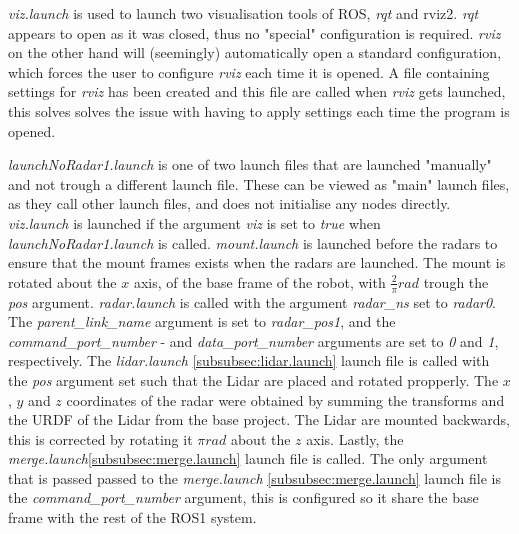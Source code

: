 \textit{viz.launch} is used to launch two visualisation tools of ROS, \textit{rqt} and {rviz2}. \textit{rqt} appears to open as it was closed, thus no "special" configuration is required. \textit{rviz} on the other hand will (seemingly) automatically open a standard configuration, which forces the user to configure \textit{rviz} each time it is opened. A file containing settings for \textit{rviz} has been created and this file are called when \textit{rviz} gets launched, this solves solves the issue with having to apply settings each time the program is opened.

\label{subsubsec:launchNoRadar1.launch}
\textit{launchNoRadar1.launch} is one of two launch files that are launched "manually" and not trough a different launch file. These can be viewed as "main" launch files, as they call other launch files, and does not initialise any nodes directly. \textit{viz.launch} is launched if the argument \textit{viz} is set to \textit{true} when \textit{launchNoRadar1.launch} is called. \textit{mount.launch} is launched before the radars to ensure that the mount frames exists when the radars are launched. The mount is rotated about the $x$ axis, of the base frame of the robot, with $\frac{2}{\pi} rad$ trough the \textit{pos} argument. \textit{radar.launch} \label{subsubsec:radar.launch} is called with the argument \textit{radar\_ns} set to \textit{radar0}. The \textit{parent\_link\_name} argument is set to \textit{radar\_pos1}, and the \textit{command\_port\_number} - and \textit{data\_port\_number} arguments are set to \textit{0} and \textit{1}, respectively. The \textit{lidar.launch} \ref{subsubsec:lidar.launch} launch file is called with the \textit{pos} argument set such that the Lidar are placed and rotated propperly. The $x$, $y$ and $z$ coordinates of the radar were obtained by summing the transforms and the URDF of the Lidar from the base project. The Lidar are mounted backwards, this is corrected by rotating it $\pi rad$ about the $z$ axis. Lastly, the \textit{merge.launch}\ref{subsubsec:merge.launch} launch file is called. The only argument that is passed passed to the \textit{merge.launch} \ref{subsubsec:merge.launch} launch file is the \textit{command\_port\_number} argument, this is configured so it share the base frame with the rest of the ROS1 system.

